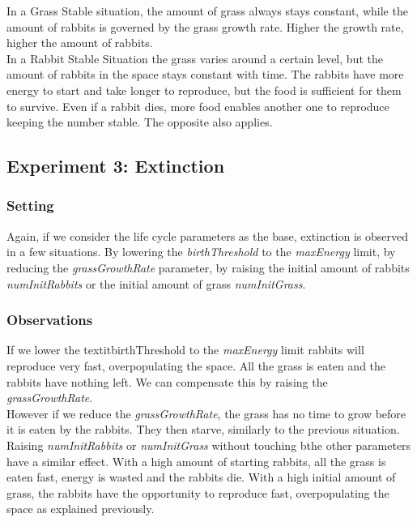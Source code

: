\documentclass[11pt]{article}
\begin{document}
In a Grass Stable situation, the amount of grass always stays constant, while the amount of rabbits is governed by the grass growth rate. Higher the growth rate, higher the amount of rabbits. \\
\indent In a Rabbit Stable Situation the grass varies around a certain level, but the amount of rabbits in the space stays constant with time. The rabbits have more energy to start and take longer to reproduce, but the food is sufficient for them to survive. Even if a rabbit dies, more food enables another one to reproduce keeping the number stable. The opposite also applies.

\subsection{Experiment 3: Extinction}

\subsubsection{Setting}

\indent Again, if we consider the life cycle parameters as the base, extinction is observed in a few situations. By lowering the \textit{birthThreshold} to the \textit{maxEnergy} limit, by reducing the \textit{grassGrowthRate} parameter, by raising the initial amount of rabbits \textit{numInitRabbits} or the initial amount of grass \textit{numInitGrass}. 

\subsubsection{Observations}

If we lower the textit{birthThreshold} to the \textit{maxEnergy} limit rabbits will reproduce very fast, overpopulating the space. All the grass is eaten and the rabbits have nothing left. We can compensate this by raising the \textit{grassGrowthRate}. \\
\indent However if we reduce the \textit{grassGrowthRate}, the grass has no time to grow before it is eaten by the rabbits. They then starve, similarly to the previous situation. \\
\indent Raising \textit{numInitRabbits} or \textit{numInitGrass} without touching bthe other parameters have a similar effect. With a high amount of starting rabbits, all the grass is eaten fast, energy is wasted and the rabbits die. With a high initial amount of grass, the rabbits have the opportunity to reproduce fast, overpopulating the space as explained previously.
\end{document}
